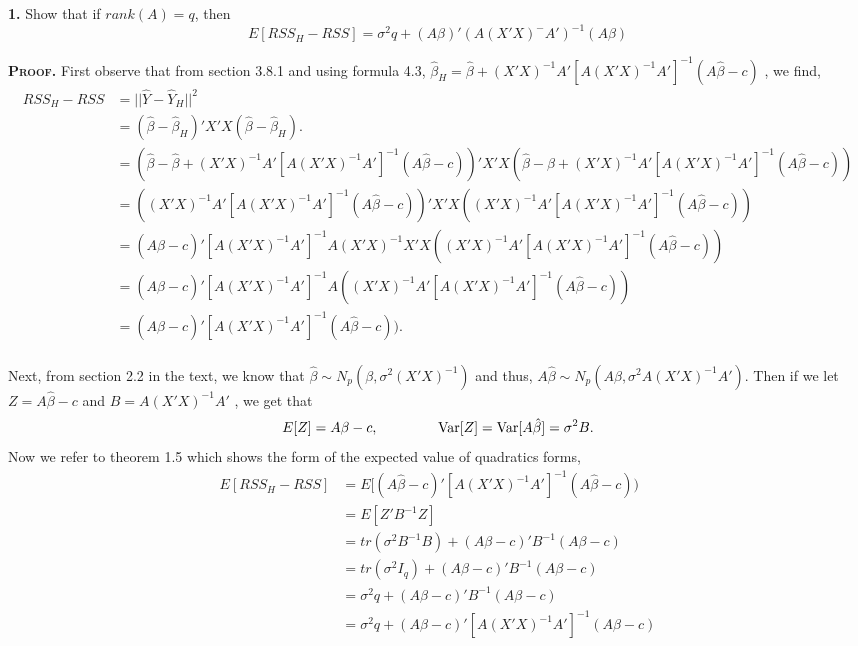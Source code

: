 \documentclass{article}
\newcommand{\Var}{\operatorname{Var}} %
\begin{document}
\setlength{\parindent}{0cm}   %



\textbf{1.} Show that if \(rank(A) = q\), then
\[
E[RSS_H - RSS] = \sigma^2q + (A\beta)'(A(X'X)^-A')^{-1}(A\beta)
\]


\vspace{5mm}
\textbf{\textsc{Proof.}} First observe that  from section 3.8.1 and using formula 4.3, \(\hat \beta_H= \hat \beta + (X'X)^{-1}A'[A(X'X)^{-1}A']^{-1}(A\hat\beta-c)\) , we find, 
\begin{align*}
RSS_H - RSS &= ||\hat Y - \hat Y_H ||^2 \\
&= (\hat \beta-\hat\beta_H)'X'X(\hat \beta-\hat\beta_H). \\
&= (\hat\beta - \hat \beta + (X'X)^{-1}A'[A(X'X)^{-1}A']^{-1}(A\hat\beta-c))'X'X(\hat\beta - \hat \beta + (X'X)^{-1}A'[A(X'X)^{-1}A']^{-1}(A\hat\beta-c))\\
&= ((X'X)^{-1}A'[A(X'X)^{-1}A']^{-1}(A\hat\beta-c))'X'X((X'X)^{-1}A'[A(X'X)^{-1}A']^{-1}(A\hat\beta-c))\\
&= (A\hat\beta-c)' [A(X'X)^{-1}A']^{-1} A(X'X)^{-1} X'X((X'X)^{-1}A'[A(X'X)^{-1}A']^{-1}(A\hat\beta-c))\\
&= (A\hat\beta-c)' [A(X'X)^{-1}A']^{-1} A((X'X)^{-1}A'[A(X'X)^{-1}A']^{-1}(A\hat\beta-c))\\
&= (A\hat\beta-c)' [A(X'X)^{-1}A']^{-1}(A\hat\beta-c)).\\
\end{align*}

Next, from section 2.2 in the text, we know that \(\hat\beta \sim N_p(\beta,\sigma^2(X'X)^{-1}) \) and thus,  \(A\hat\beta \sim N_p(A\beta,\sigma^2A(X'X)^{-1}A') \). Then if we let \(Z= A\hat\beta-c\) and \( B = A(X'X)^{-1}A' \) , we get that 
\[
E[Z] = A\beta -c, \hspace{15mm} \Var[Z] =\Var[A\hat\beta] = \sigma^2B.
\]
Now we refer to theorem 1.5 which shows the form of the expected value of quadratics forms, 
\begin{align*}
E[RSS_H - RSS] &= E[(A\hat\beta-c)' [A(X'X)^{-1}A']^{-1}(A\hat\beta-c)) \\
&= E[Z'B^{-1}Z]  \\
&= tr(\sigma^2B^{-1}B) + (A\beta-c)'B^{-1}(A\beta-c)\\
&= tr(\sigma^2I_q) + (A\beta-c)'B^{-1}(A\beta-c) \\
&= \sigma^2q + (A\beta-c)'B^{-1}(A\beta-c) \\
&=  \sigma^2q + (A\beta-c)'[A(X'X)^{-1}A']^{-1}(A\beta-c) \\
\end{align*}
\end{document}
